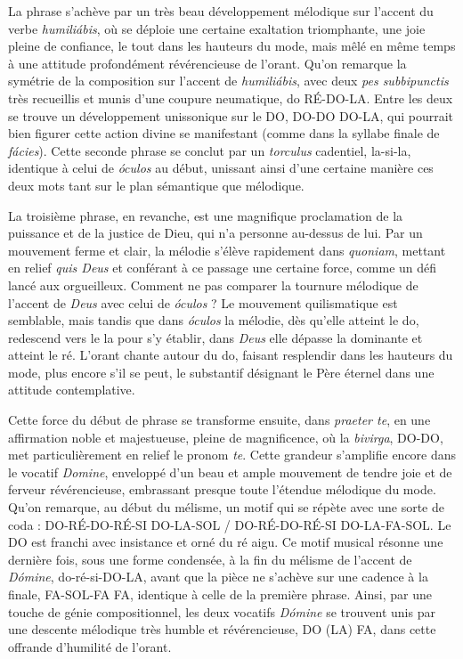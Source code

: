 \documentclass[Session2026.tex]{subfiles}
\begin{document}
La phrase s'achève par un très beau développement mélodique sur l'accent
du verbe \emph{humiliábis}, où se déploie une certaine exaltation
triomphante, une joie pleine de confiance, le tout dans les hauteurs du
mode, mais mêlé en même temps à une attitude profondément révérencieuse
de l'orant. Qu'on remarque la symétrie de la composition sur l'accent de
\emph{humiliábis}, avec deux \emph{pes subbipunctis} très recueillis et
munis d'une coupure neumatique, do RÉ-DO-LA. Entre les deux se trouve un
développement unissonique sur le DO, DO-DO DO-LA, qui pourrait bien
figurer cette action divine se manifestant (comme dans la syllabe finale
de \emph{fácies}). Cette seconde phrase se conclut par un
\emph{torculus} cadentiel, la-si-la, identique à celui de \emph{óculos}
au début, unissant ainsi d'une certaine manière ces deux mots tant sur
le plan sémantique que mélodique.

La troisième phrase, en revanche, est une magnifique proclamation de la
puissance et de la justice de Dieu, qui n'a personne au-dessus de lui.
Par un mouvement ferme et clair, la mélodie s'élève rapidement dans
\emph{quoniam}, mettant en relief \emph{quis Deus} et conférant à ce
passage une certaine force, comme un défi lancé aux orgueilleux. Comment
ne pas comparer la tournure mélodique de l'accent de \emph{Deus} avec
celui de \emph{óculos} ? Le mouvement quilismatique est semblable, mais
tandis que dans \emph{óculos} la mélodie, dès qu'elle atteint le do,
redescend vers le la pour s'y établir, dans \emph{Deus} elle dépasse la
dominante et atteint le ré. L'orant chante autour du do, faisant
resplendir dans les hauteurs du mode, plus encore s'il se peut, le
substantif désignant le Père éternel dans une attitude contemplative.

Cette force du début de phrase se transforme ensuite, dans \emph{praeter
te}, en une affirmation noble et majestueuse, pleine de magnificence, où
la \emph{bivirga}, DO-DO, met particulièrement en relief le pronom
\emph{te}. Cette grandeur s'amplifie encore dans le vocatif
\emph{Domine}, enveloppé d'un beau et ample mouvement de tendre joie et
de ferveur révérencieuse, embrassant presque toute l'étendue mélodique
du mode. Qu'on remarque, au début du mélisme, un motif qui se répète
avec une sorte de coda : DO-RÉ-DO-RÉ-SI DO-LA-SOL / DO-RÉ-DO-RÉ-SI
DO-LA-FA-SOL. Le DO est franchi avec insistance et orné du ré aigu. Ce
motif musical résonne une dernière fois, sous une forme condensée, à la
fin du mélisme de l'accent de \emph{Dómine}, do-ré-si-DO-LA, avant que
la pièce ne s'achève sur une cadence à la finale, FA-SOL-FA FA,
identique à celle de la première phrase. Ainsi, par une touche de génie
compositionnel, les deux vocatifs \emph{Dómine} se trouvent unis par une
descente mélodique très humble et révérencieuse, DO (LA) FA, dans cette
offrande d'humilité de l'orant.
\end{document}
